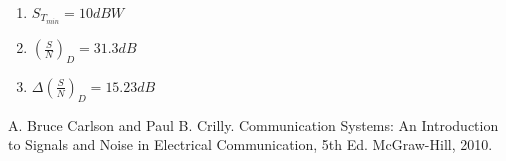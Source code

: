 \documentclass[es,boletin]{uah}
\begin{document}
{
\begin{enumerate}
	\item $S_{T_{min}} = 10dBW$
	\item $\left ( \frac{S}{N} \right )_D = 31.3 dB$
	\item $\Delta \left ( \frac{S}{N} \right )_D = 15.23 dB$
\end{enumerate}
}




\begin{thebibliography}{100}
	 A. Bruce Carlson and Paul B. Crilly. Communication Systems: An Introduction to Signals and Noise in Electrical Communication, 5th Ed. McGraw-Hill, 2010.
	\end{thebibliography}
	
	
\end{document}

